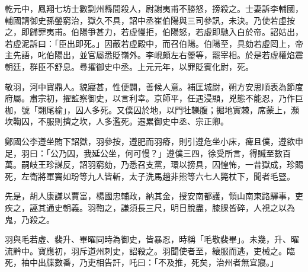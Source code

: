 \begin{pinyinscope}
 乾元中，鳳翔七坊士數剽州縣間殺人，尉謝夷甫不勝怒，搒殺之。士妻訴李輔國，輔國請御史孫鎣窮治，獄久不具，詔中丞崔伯陽與三司參訊，未決。乃使若虛按之，即歸罪夷甫。伯陽爭甚力，若虛慢拒，伯陽怒，若虛即馳入白於帝。詔姑出，若虛泥訴曰：「臣出即死。」因蔽若虛殿中，而召伯陽。伯陽至，具劾若虛罔上，帝主先語，叱伯陽出，並官屬悉貶嶺外。李峴頗左右鎣等，罷宰相。於是若虛權焰震朝廷，群臣不舒息。尋擢御史中丞。上元元年，以罪貶賓化尉，死。



 敬羽，河中寶鼎人。貌寢甚，性便闢，善候人意。補匡城尉，朔方安思順表為節度府屬。肅宗初，擢監察御史，以言利幸。京師平，任遇浸顯，兇態不能忍，乃作巨枷，號「翾尾榆」，囚人多死。又僕囚於地，以門牡轢腹；掘地實棘，席蒙上，瀕坎鞫囚，不服則擠之坎，人多濫死。遷累御史中丞、宗正卿。



 鄭國公李遵坐賄下詔獄，羽參按，遵肥而羽瘠，則引遵危坐小床，痺且僕，遵欲申足，羽曰：「公乃囚，我延公坐，何可慢？」遵僕三四，徐受所言，得贓至數百萬。嗣岐王珍謀反，詔羽窮劾，乃悉召支黨，環以搒具，囚惶怖，一昔獄成，珍賜死，左衛將軍竇如玢等九人皆斬，太子洗馬趙非熊等六七人斃杖下，聞者毛豎。



 先是，胡人康謙以賈富，楊國忠輔政，納其金，授安南都護，領山南東路驛事，吏疾之，誣其通史朝義。羽鞫之，謙須長三尺，明日脫盡，膝腂皆碎，人視之以為鬼，乃殺之。



 羽與毛若虛、裴升、畢曜同時為御史，皆暴忍，時稱「毛敬裴畢」。未幾，升、曜流黔中。寶應初，羽斥道州刺史，詔殺之。羽聞使者至，縗服而逃，吏械之。臨死，袖中出牒數番，乃吏相告訐，吒曰：「不及推，死矣，治州者無宜寢。」



\end{pinyinscope}